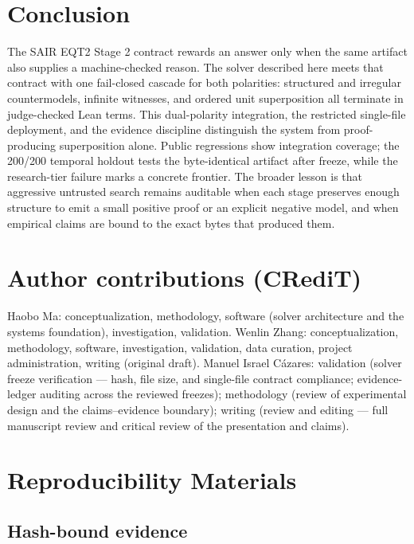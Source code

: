 \documentclass[10pt,twocolumn]{article}
\begin{document}
\section{Conclusion}

The SAIR EQT2 Stage 2 contract rewards an answer only when the same artifact
also supplies a machine-checked reason.  The solver described here meets that
contract with one fail-closed cascade for both polarities: structured and
irregular countermodels, infinite witnesses, and ordered unit superposition
all terminate in judge-checked Lean terms.  This dual-polarity integration,
the restricted single-file deployment, and the evidence discipline distinguish
the system from proof-producing superposition alone.  Public regressions show
integration coverage; the 200/200 temporal holdout tests the byte-identical
artifact after freeze, while the research-tier failure marks a concrete
frontier.
The broader lesson is that aggressive untrusted search remains auditable when
each stage preserves enough structure to emit a small positive proof or an
explicit negative model, and when empirical claims are bound to the exact
bytes that produced them.

\ifplainarticle
  
\else
  
\fi
\ifanonsubmission\else
\section*{Author contributions (CRediT)}
Haobo Ma: conceptualization, methodology, software (solver architecture and the
systems foundation), investigation, validation.
Wenlin Zhang: conceptualization, methodology, software, investigation,
validation, data curation, project administration, writing (original draft).
Manuel Israel C\'azares: validation (solver freeze verification --- hash, file
size, and single-file contract compliance; evidence-ledger auditing across the
reviewed freezes); methodology (review of experimental design and the
claims--evidence boundary); writing (review and editing --- full manuscript
review and critical review of the presentation and claims).
\fi



\appendix

\section{Reproducibility Materials}
\label{app:repro}

\subsection{Hash-bound evidence}
\end{document}
